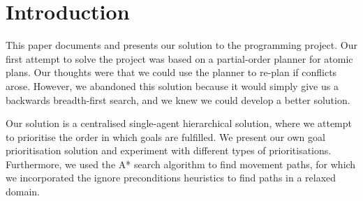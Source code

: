 \section{Introduction}
\label{sec:introduction}


This paper documents and presents our solution to the programming project.
Our first attempt to solve the project was based on a partial-order planner for atomic plans.
Our thoughts were that we could use the planner to re-plan if conflicts arose.
However, we abandoned this solution because it would simply give us a backwards breadth-first search, and we knew we could develop a better solution.

Our solution is a centralised single-agent hierarchical solution, where we attempt to prioritise the order in which goals are fulfilled.
We present our own goal prioritisation solution and experiment with different types of prioritisations.
Furthermore, we used the A* search algorithm to find movement paths, for which we incorporated the ignore preconditions heuristics to find paths in a relaxed domain.
